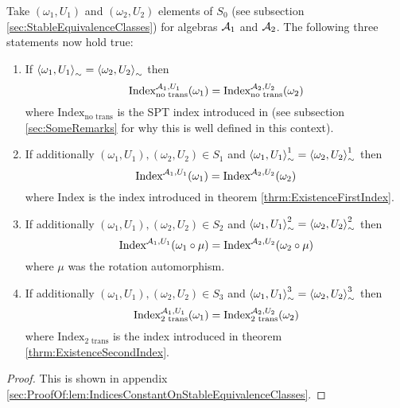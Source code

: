 \documentclass[11pt,a4paper,twoside]{article}
\numberwithin{equation}{section}
\begin{document}
\begin{lemma}\label{lem:IndicesConstantOnStableEquivalenceClasses}
	Take $(\omega_1,U_1)$ and $(\omega_2,U_2)$ elements of $S_0$ (see subsection \ref{sec:StableEquivalenceClasses}) for algebras $\AA_1$ and $\AA_2$. The following three statements now hold true:
	\begin{enumerate}
		\item If $\expval{\omega_1,U_1}_\sim=\expval{\omega_2,U_2}_\sim$ then
		\begin{equation}
			\textrm{Index}^{\AA_1,U_1}_{\text{no trans}}(\omega_1)=\textrm{Index}^{\AA_2,U_2}_{\text{no trans}}(\omega_2)
		\end{equation}
		where $\textrm{Index}_{\text{no trans}}$ is the SPT index introduced in \cite{ogata2021h3gmathbb} (see subsection \ref{sec:SomeRemarks} for why this is well defined in this context).
		\item If additionally $(\omega_1,U_1),(\omega_2,U_2)\in S_1$ and $\expval{\omega_1,U_1}_\sim^1=\expval{\omega_2,U_2}_\sim^1$ then
		\begin{equation}
			\textrm{Index}^{\AA_1,U_1}(\omega_1)=\textrm{Index}^{\AA_2,U_2}(\omega_2)
		\end{equation}
		where $\textrm{Index}$ is the index introduced in theorem \ref{thrm:ExistenceFirstIndex}.
		\item If additionally $(\omega_1,U_1),(\omega_2,U_2)\in S_2$ and $\expval{\omega_1,U_1}_\sim^2=\expval{\omega_2,U_2}_\sim^2$ then
		\begin{equation}
			\textrm{Index}^{\AA_1,U_1}(\omega_1\circ\mu)=\textrm{Index}^{\AA_2,U_2}(\omega_2\circ\mu)
		\end{equation}
		where $\mu$ was the rotation automorphism.
		\item If additionally $(\omega_1,U_1),(\omega_2,U_2)\in S_3$ and $\expval{\omega_1,U_1}_\sim^3=\expval{\omega_2,U_2}_\sim^3$ then
		\begin{equation}
			\textrm{Index}^{\AA_1,U_1}_{\text{2 trans}}(\omega_1)=\textrm{Index}^{\AA_2,U_2}_{\text{2 trans}}(\omega_2)
		\end{equation}
		where $\textrm{Index}_{\text{2 trans}}$ is the index introduced in theorem \ref{thrm:ExistenceSecondIndex}.
	\end{enumerate}
\end{lemma}
\begin{proof}
	This is shown in appendix \ref{sec:ProofOf:lem:IndicesConstantOnStableEquivalenceClasses}.
\end{proof}
\end{document}
